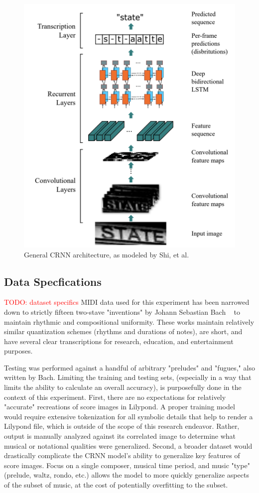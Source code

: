 \documentclass[review,sigconf]{acmart}
\newcommand{\todo}[1]{\textcolor{red}{TODO: #1}}
\begin{document}
\begin{figure}
	\centering
	\includegraphics[width = .8\linewidth]{./figures/crnn_arch.png}
	\caption{General CRNN architecture, as modeled by Shi, et al. ~\cite{shi2015endtoend}}
	\label{fig:crnn-arch}
\end{figure}

\subsection{Data Specfications}
\todo{dataset specifics}
MIDI data used for this experiment has been narrowed down to strictly fifteen two-stave "inventions" by Johann Sebastian Bach ~\cite{bach_midi} to maintain rhythmic and compositional uniformity.
These works maintain relatively similar quantization schemes (rhythms and durations of notes), are short, and have several clear transcriptions for research, education, and entertainment purposes.

Testing was performed against a handful of arbitrary "preludes" and "fugues," also written by Bach. 
Limiting the training and testing sets, (especially in a way that limits the ability to calculate an overall accuracy), is purposefully done in the context of this experiment.
First, there are no expectations for relatively "accurate" recreations of score images in Lilypond. 
A proper training model would require extensive tokenization for all symbolic details that help to render a Lilypond file, which is outside of the scope of this research endeavor.
Rather, output is manually analyzed against its correlated image to determine what musical or notational qualities were generalized.
Second, a broader dataset would drastically complicate the CRNN model's ability to generalize key features of score images.
Focus on a single composer, musical time period, and music "type" (prelude, waltz, rondo, etc.) allows the model to more quickly generalize aspects of the subset of music, at the cost of potentially overfitting to the subset.
\end{document}

